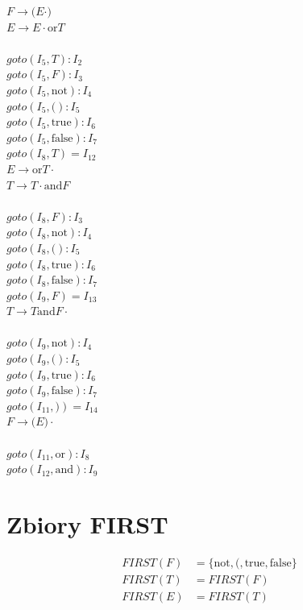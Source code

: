 \documentclass{article}
\begin{document}
$F\to \lparen E \cdot \rparen$\\
$E\to E \cdot \text{or} T$\\\\
$goto(I_5, T) : I_{2}$\\
$goto(I_5, F) : I_{3}$\\
$goto(I_5, \text{not}) : I_{4}$\\
$goto(I_5, \lparen) : I_{5}$\\
$goto(I_5, \text{true}) : I_{6}$\\
$goto(I_5, \text{false}) : I_{7}$\\
$goto(I_8, T) = I_{12}$\\
$E\to \text{or} T \cdot $\\
$T\to T \cdot \text{and} F$\\\\
$goto(I_8, F) : I_{3}$\\
$goto(I_8, \text{not}) : I_{4}$\\
$goto(I_8, \lparen) : I_{5}$\\
$goto(I_8, \text{true}) : I_{6}$\\
$goto(I_8, \text{false}) : I_{7}$\\
$goto(I_9, F) = I_{13}$\\
$T\to T \text{and} F \cdot$\\\\
$goto(I_9, \text{not}) : I_{4}$\\
$goto(I_9, \lparen) : I_{5}$\\
$goto(I_9, \text{true}) : I_{6}$\\
$goto(I_9, \text{false}) : I_{7}$\\
$goto(I_{11}, \rparen) = I_{14}$\\
$F\to \lparen E \rparen \cdot$\\\\
$goto(I_{11}, \text{or}) : I_{8}$\\
$goto(I_{12}, \text{and}) : I_{9}$\\

\section*{Zbiory FIRST}
\begin{align*}
FIRST(F) &= \{\text{not}, \text{(}, \text{true}, \text{false}\} \\
FIRST(T) &= FIRST(F) \\
FIRST(E) &= FIRST(T)
\end{align*}
\end{document}
